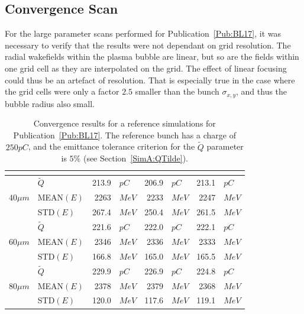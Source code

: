 \subsection{Convergence Scan}
\label{SimA:Converge}

For the large parameter scans performed for Publication~\ref{Pub:BL17}, it was necessary to verify that the results were not dependant on grid resolution.
The radial wakefields within the plasma bubble are linear, but so are the fields within one grid cell as they are interpolated on the grid.
The effect of linear focusing could thus be an artefact of resolution.
That is especially true in the case where the grid cells were only a factor $2.5$ smaller than the bunch $\sigma_{x,y}$, and thus the bubble radius also small.

\begin{table}[hbt]
    \centering
    \caption{Convergence results for a reference simulations for Publication~\ref{Pub:BL17}.
    The reference bunch has a charge of $250\unit{pC}$, and the emittance tolerance criterion for the $\tilde{Q}$ parameter is $5\%$ (see Section~\ref{SimA:QTilde}).}
    \label{T:Converg}
    \begin{tabularx}{132mm}{Xl d{1}l d{1}l d{1}l}
         & 
            & 
            & 
            &  \\
        \hline
                         & $\tilde{Q}$ &  213.9 & $\unit{pC}$  &  206.9 & $\unit{pC}$  &  213.1 & $\unit{pC}$  \\
        $40\unit{\mu m}$ & MEAN$(E)$   & 2263   & $\unit{MeV}$ & 2233   & $\unit{MeV}$ & 2247   & $\unit{MeV}$ \\
                         & STD$(E)$    &  267.4 & $\unit{MeV}$ &  250.4 & $\unit{MeV}$ &  261.5 & $\unit{MeV}$ \\
        \hline
                         & $\tilde{Q}$ &  221.6 & $\unit{pC}$  &  222.0 & $\unit{pC}$  &  222.1 & $\unit{pC}$  \\
        $60\unit{\mu m}$ & MEAN$(E)$   & 2346   & $\unit{MeV}$ & 2336   & $\unit{MeV}$ & 2333   & $\unit{MeV}$ \\
                         & STD$(E)$    &  166.8 & $\unit{MeV}$ &  165.0 & $\unit{MeV}$ &  165.5 & $\unit{MeV}$ \\
        \hline
                         & $\tilde{Q}$ &  229.9 & $\unit{pC}$  &  226.9 & $\unit{pC}$  &  224.8 & $\unit{pC}$  \\
        $80\unit{\mu m}$ & MEAN$(E)$   & 2378   & $\unit{MeV}$ & 2379   & $\unit{MeV}$ & 2368   & $\unit{MeV}$ \\
                         & STD$(E)$    &  120.0 & $\unit{MeV}$ &  117.6 & $\unit{MeV}$ &  119.1 & $\unit{MeV}$ \\
    \end{tabularx}
\end{table}

